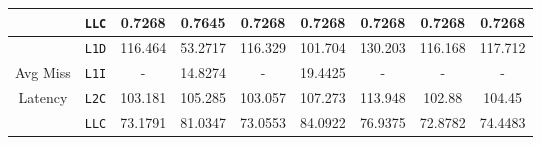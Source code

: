 \documentclass[11pt, swedish, openany]{book}
\begin{document}
\begin{table}[H]
\begin{tabular}{||c|c||c||c|c||c|c||c|c||}
                                            & \texttt{LLC} & 0.7268                    & 0.7645   & 0.7268      & 0.7268   & 0.7268   & 0.7268   & 0.7268   \\
        \hline
                                            & \texttt{L1D} & 116.464                   & 53.2717  & 116.329     & 101.704  & 130.203  & 116.168  & 117.712  \\
        Avg Miss                            & \texttt{L1I} & -                         & 14.8274  & -           & 19.4425  & -        & -        & -        \\
        Latency                             & \texttt{L2C} & 103.181                   & 105.285  & 103.057     & 107.273  & 113.948  & 102.88   & 104.45   \\
                                            & \texttt{LLC} & 73.1791                   & 81.0347  & 73.0553     & 84.0922  & 76.9375  & 72.8782  & 74.4483  \\
        \hline
    \end{tabular}
\end{table}
\end{document}
